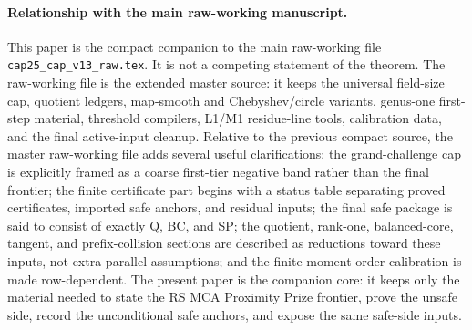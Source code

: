 \documentclass[11pt]{article}
\theoremstyle{definition}
\theoremstyle{remark}
\begin{document}
\paragraph{Relationship with the main raw-working manuscript.}
This paper is the compact companion to the main raw-working file
\texttt{cap25\_cap\_v13\_raw.tex}.  It is not a competing statement of the
theorem.  The raw-working file is the extended master source: it
keeps the universal field-size cap, quotient ledgers, map-smooth and
Chebyshev/circle variants, genus-one first-step material, threshold compilers,
L1/M1 residue-line tools, calibration data, and the final active-input cleanup.
Relative to the previous compact source, the master raw-working file adds several
useful clarifications: the grand-challenge cap is explicitly framed as a coarse
first-tier negative band rather than the final frontier; the finite certificate
part begins with a status table separating proved certificates, imported safe
anchors, and residual inputs; the final safe package is said to consist of
exactly Q, BC, and SP; the quotient, rank-one, balanced-core, tangent, and
prefix-collision sections are described as reductions toward these inputs, not
extra parallel assumptions; and the finite moment-order calibration is made
row-dependent.  The present paper is the companion core: it keeps only the
material needed to state the RS MCA Proximity Prize frontier, prove the unsafe
side, record the unconditional safe anchors, and expose the same safe-side
inputs.
\end{document}
